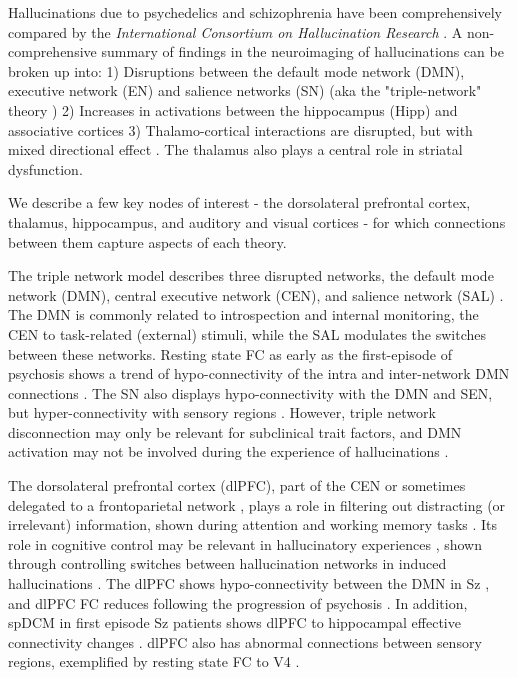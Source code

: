 \documentclass{article}
\begin{document}
Hallucinations due to psychedelics and schizophrenia have been comprehensively compared by the \textit{International Consortium on Hallucination Research} \citep{leptourgos_hallucinations_2020}. A non-comprehensive summary of findings in the neuroimaging of hallucinations can be broken up into: 
1) Disruptions between the default mode network (DMN), executive network (EN) and salience networks (SN) (aka the "triple-network" theory \citep{menon_large-scale_2011, bolton_triple_2020})
2) Increases in activations between the hippocampus (Hipp) and associative cortices \citep{amad_multimodal_2014, uscatescu_effective_2021} 
3) Thalamo-cortical interactions are disrupted, but with mixed directional effect \citep{giraldo-chica_review_2017}. The thalamus also plays a central role in striatal dysfunction.

We describe a few key nodes of interest - the dorsolateral prefrontal cortex, thalamus, hippocampus, and auditory and visual cortices - for which connections between them capture aspects of each theory.

The triple network model describes three disrupted networks, the default mode network (DMN), central executive network (CEN), and salience network (SAL) \citep{Menon2011}. The DMN is commonly related to introspection and internal monitoring, the CEN to task-related (external) stimuli, while the SAL modulates the switches between these networks.  Resting state FC as early as the first-episode of psychosis shows a trend of hypo-connectivity of the intra and inter-network DMN connections \citep{oneill_dysconnectivity_2019}. The SN also displays hypo-connectivity with the DMN and SEN, but hyper-connectivity with sensory regions \citep{oneill_dysconnectivity_2019}. However, triple network disconnection may only be relevant for subclinical trait factors, and DMN activation may not be involved during the experience of hallucinations \citep{fuentes-claramonte2021auditory, martino2024working}.  

The dorsolateral prefrontal cortex (dlPFC), part of the CEN \citep{Seeley2007network} or sometimes delegated to a frontoparietal network \citep{menon_integrative_2023}, plays a role in filtering out distracting (or irrelevant) information, shown during attention and working memory tasks \citep{smucny_8_2023, sheffield_cognition_2016}. Its role in cognitive control may be relevant in hallucinatory experiences \citep{jardri_are_2016, hugdahl_role_2025}, shown through controlling switches between hallucination networks in induced hallucinations \citep{dhanis_real-time_2024}. The dlPFC shows hypo-connectivity between the DMN in Sz \citep{dong_dysfunction_2018}, and dlPFC FC reduces following the progression of psychosis \citep{sabaroedin_circuit_2023}. In addition, spDCM in first episode Sz patients shows dlPFC to hippocampal effective connectivity changes \citep{cui_anterior_2015}. dlPFC also has abnormal connections between sensory regions, exemplified by resting state FC to V4 \citep{chechko_differential_2018}. 
 
\end{document}
